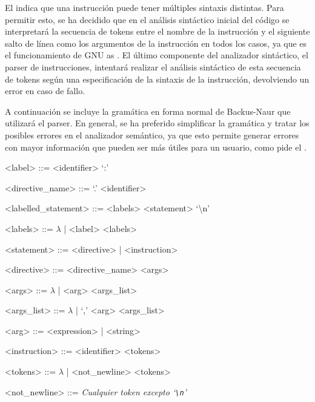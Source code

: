 El  indica que una instrucción puede tener
múltiples sintaxis distintas. Para permitir esto, se ha decidido que en el
análisis sintáctico inicial del código se interpretará la secuencia de
\glspl{token} entre el nombre de la instrucción y el siguiente salto de línea
como los argumentos de la instrucción en todos los casos, ya que es el
funcionamiento de GNU as \parencite{as-manual}. El último componente del
analizador sintáctico, el \gls{parser} de instrucciones, intentará realizar el
análisis sintáctico de esta secuencia de \glspl{token} según una especificación
de la sintaxis de la instrucción, devolviendo un error en caso de fallo.

A continuación se incluye la gramática en forma normal de Backus-Naur
\parencite{BNF} que utilizará el \gls{parser}. En general, se ha preferido
simplificar la gramática y tratar los posibles errores en el analizador
semántico, ya que esto permite generar errores con mayor información que pueden
ser más útiles para un usuario, como pide el . %

\newcommand{\EOL}{\textbackslash{}n}
\newcommand{\verbEOL}{`\texttt{\textbackslash{}n}'}

\begin{tcolorbox}[enhanced jigsaw,breakable,top=4mm]
    \begin{grammar}
       <label> ::= <identifier> `:'

       <directive\_name> ::= `.' <identifier>

       <labelled\_statement> ::= <labels> <statement> `\EOL'

       <labels> ::= $\lambda$ | <label> <labels>

       <statement> ::= <directive> | <instruction>

       <directive> ::= <directive\_name> <args>

       <args> ::= $\lambda$ | <arg> <args\_list>

       <args\_list> ::= $\lambda$ | `,' <arg> <args\_list>

       <arg> ::= <expression> | <string>

       <instruction> ::= <identifier> <tokens>

       <tokens> ::= $\lambda$ | <not\_newline> <tokens>

       <not\_newline> ::= \textit{Cualquier token excepto \verbEOL}
    \end{grammar}
\end{tcolorbox}

